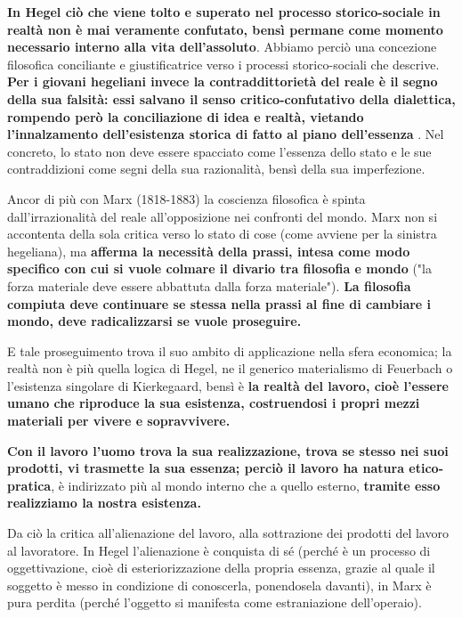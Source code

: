  \textbf{In Hegel ciò che viene tolto e superato nel processo storico-sociale in realtà non è mai veramente confutato, bensì permane come momento necessario interno alla vita dell'assoluto}. Abbiamo perciò una concezione filosofica conciliante e giustificatrice verso i processi storico-sociali che descrive. \textbf{Per i giovani hegeliani invece la contraddittorietà del reale è il segno della sua falsità: essi salvano il senso critico-confutativo della dialettica, rompendo però la conciliazione di idea e realtà, vietando l'innalzamento dell'esistenza storica di fatto al piano dell'essenza }. Nel concreto, lo stato non deve essere spacciato come l'essenza dello stato e le sue contraddizioni come segni della sua razionalità, bensì della sua imperfezione.
 
 Ancor di più con Marx (1818-1883) la coscienza filosofica è spinta dall'irrazionalità del reale all'opposizione nei confronti del mondo. Marx non si accontenta della sola critica verso lo stato di cose (come avviene per la sinistra hegeliana), ma \textbf{afferma la necessità della prassi, intesa come modo specifico con cui si vuole colmare il divario tra filosofia e mondo} ("la forza materiale deve essere abbattuta dalla forza materiale"). \textbf{La filosofia compiuta deve continuare se stessa nella prassi al fine di cambiare i mondo, deve radicalizzarsi se vuole proseguire.}
 
 E tale proseguimento trova il suo ambito di applicazione nella sfera economica; la realtà non è più quella logica di Hegel, ne il generico materialismo di Feuerbach o l'esistenza singolare di Kierkegaard, bensì è \textbf{la realtà del lavoro, cioè l'essere umano che riproduce la sua esistenza, costruendosi i propri mezzi materiali per vivere e sopravvivere.}
 
 \textbf{Con il lavoro l'uomo trova la sua realizzazione, trova se stesso nei suoi prodotti, vi trasmette la sua essenza; perciò il lavoro ha natura etico-pratica}, è indirizzato più al mondo interno che a quello esterno, \textbf{tramite esso realizziamo la nostra esistenza.}
 
 Da ciò la critica all'alienazione del lavoro, alla sottrazione dei prodotti del lavoro al lavoratore. In Hegel l'alienazione è conquista di sé (perché è un processo di oggettivazione, cioè di esteriorizzazione della propria essenza, grazie al quale il soggetto è messo in condizione di conoscerla, ponendosela davanti), in Marx è pura perdita (perché l'oggetto si manifesta come estraniazione dell'operaio).
 
